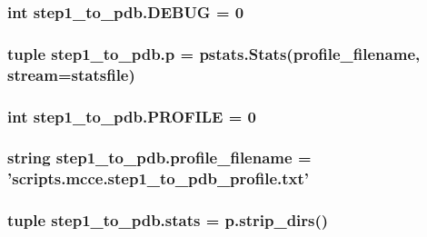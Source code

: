 \hypertarget{namespacestep1__to__pdb_a591354d4432ea8e5ce9bba8b7dc8ba1a}{
\subsubsection[{D\-E\-B\-U\-G}]{\setlength{\rightskip}{0pt plus 5cm}int step1\-\_\-to\-\_\-pdb.\-D\-E\-B\-U\-G = 0}}\label{namespacestep1__to__pdb_a591354d4432ea8e5ce9bba8b7dc8ba1a}
\hypertarget{namespacestep1__to__pdb_a68130cab309339df09d927f67bb7ea84}{
\subsubsection[{p}]{\setlength{\rightskip}{0pt plus 5cm}tuple step1\-\_\-to\-\_\-pdb.\-p = pstats.\-Stats({\bf profile\-\_\-filename}, stream={\bf statsfile})}}\label{namespacestep1__to__pdb_a68130cab309339df09d927f67bb7ea84}
\hypertarget{namespacestep1__to__pdb_ad76c59cb2cdd3d781f868a12529999ba}{
\subsubsection[{P\-R\-O\-F\-I\-L\-E}]{\setlength{\rightskip}{0pt plus 5cm}int step1\-\_\-to\-\_\-pdb.\-P\-R\-O\-F\-I\-L\-E = 0}}\label{namespacestep1__to__pdb_ad76c59cb2cdd3d781f868a12529999ba}
\hypertarget{namespacestep1__to__pdb_adc86c06ee1539131101783440ad9a108}{
\subsubsection[{profile\-\_\-filename}]{\setlength{\rightskip}{0pt plus 5cm}string step1\-\_\-to\-\_\-pdb.\-profile\-\_\-filename = 'scripts.\-mcce.\-step1\-\_\-to\-\_\-pdb\-\_\-profile.\-txt'}}\label{namespacestep1__to__pdb_adc86c06ee1539131101783440ad9a108}
\hypertarget{namespacestep1__to__pdb_ad2df9fbec0d313239d036a67c94664fb}{
\subsubsection[{stats}]{\setlength{\rightskip}{0pt plus 5cm}tuple step1\-\_\-to\-\_\-pdb.\-stats = p.\-strip\-\_\-dirs()}}\label{namespacestep1__to__pdb_ad2df9fbec0d313239d036a67c94664fb}

